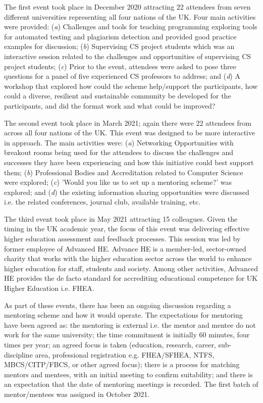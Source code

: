 \documentclass[sigconf]{acmart}
\begin{document}
The first event took place in December 2020 attracting 22 attendees
from seven different universities representing all four nations of the
UK. Four main activities were provided: ({\emph{a}}) Challenges and
tools for teaching programming exploring tools for automated testing
and plagiarism detection and provided good practice examples for
discussion; ({\emph{b}}) Supervising CS project students which was an
interactive session related to the challenges and opportunities of
supervising CS project students; ({\emph{c}}) Prior to the event,
attendees were asked to pose three questions for a panel of five
experienced CS professors to address; and ({\emph{d}}) A workshop that
explored how could the scheme help/support the participants, how could
a diverse, resilient and sustainable community be developed for the
participants, and did the format work and what could be improved?

The second event took place in March 2021; again there were 22
attendees from across all four nations of the UK. This event was
designed to be more
interactive in approach. The main activities were: ({\emph{a}})
Networking Opportunities with breakout rooms being used for the
attendees to discuss the challenges and successes they have been
experiencing and how this initiative could best support them;
({\emph{b}}) Professional Bodies and Accreditation related to Computer
Science were explored; ({\emph{c}}) 'Would you like us to set up a
mentoring scheme?' was explored; and ({\emph{d}}) the existing
information sharing opportunities were discussed i.e. the related
conferences, journal club, available training, etc.

The third event took place in May 2021 attracting 15 colleagues. Given
the timing in the UK academic year, the focus of this event was
delivering effective higher education assessment and feedback
processes. This session was led by former employee of Advanced
HE. Advance HE is a member-led, sector-owned charity that works with
the higher education sector across the world to enhance higher
education for staff, students and society. Among other activities,
Advanced HE provides the de facto standard for accrediting educational
competence for UK Higher Education i.e. FHEA.

As part of these events, there has been an ongoing discussion
regarding a mentoring scheme and how it would operate. The
expectations for mentoring have been agreed as: the mentoring is
external i.e. the mentor and mentee do not work for the same
university; the time commitment is initially 60 minutes, four times
per year; an agreed focus is taken (education, research, career,
sub-discipline area, professional registration e.g. FHEA/SFHEA, NTFS,
MBCS/CITP/FBCS, or other agreed focus); there is a process for
matching mentors and mentees, with an initial meeting to confirm
suitability; and there is an expectation that the date of mentoring
meetings is recorded. The first batch of mentor/mentees was assigned
in October 2021.
\end{document}
